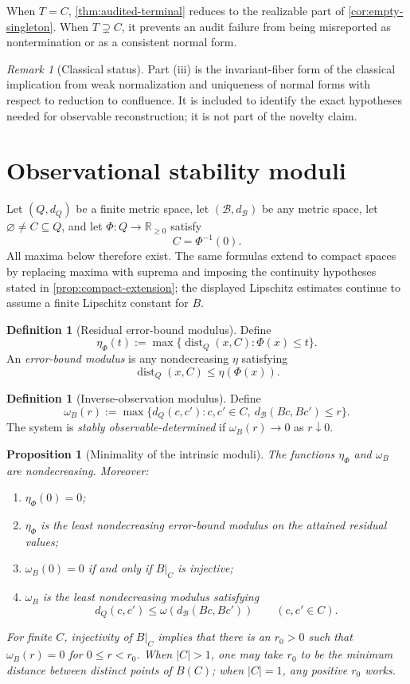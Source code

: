\documentclass[11pt]{article}
\newtheorem{proposition}[theorem]{Proposition}
\theoremstyle{definition}
\newtheorem{definition}[theorem]{Definition}
\theoremstyle{remark}
\newtheorem{remark}[theorem]{Remark}
\numberwithin{equation}{section}
\newcommand{\dist}{\operatorname{dist}}
\newcommand{\cB}{\mathcal B}
\begin{document}
When $T=C$, \cref{thm:audited-terminal} reduces to the realizable part of
\cref{cor:empty-singleton}.  When $T\supsetneq C$, it prevents an audit
failure from being misreported as nontermination or as a consistent normal
form.

\begin{remark}[Classical status]
Part (iii) is the invariant-fiber form of the classical implication from weak normalization and uniqueness of normal forms with respect to reduction to confluence.  It is included to identify the exact hypotheses needed for observable reconstruction; it is not part of the novelty claim.
\end{remark}

\section{Observational stability moduli}\label{sec:stability}

Let $(Q,d_Q)$ be a finite metric space, let $(\cB,d_{\cB})$ be any metric
space, let $\varnothing\ne C\subseteq Q$, and let
$\Phi:Q\to\mathbb R_{\ge0}$ satisfy
\[
 C=\Phi^{-1}(0).
\]
All maxima below therefore exist.  The same formulas extend to compact spaces
by replacing maxima with suprema and imposing the continuity hypotheses stated
in \cref{prop:compact-extension}; the displayed Lipschitz estimates continue
to assume a finite Lipschitz constant for $B$.

\begin{definition}[Residual error-bound modulus]
Define
\[
 \eta_\Phi(t):=
 \max\{\dist_Q(x,C):\Phi(x)\le t\}.
\]
An \emph{error-bound modulus} is any nondecreasing $\eta$ satisfying
\[
 \dist_Q(x,C)\le\eta(\Phi(x)).
\]
\end{definition}

\begin{definition}[Inverse-observation modulus]
Define
\[
 \omega_B(r):=
 \max\{d_Q(c,c'):c,c'\in C,\ d_{\cB}(Bc,Bc')\le r\}.
\]
The system is \emph{stably observable-determined} if $\omega_B(r)\to0$ as $r\downarrow0$.
\end{definition}

\begin{proposition}[Minimality of the intrinsic moduli]\label{prop:minimal-moduli}
The functions $\eta_\Phi$ and $\omega_B$ are nondecreasing.  Moreover:
\begin{enumerate}[label=(\roman*)]
\item $\eta_\Phi(0)=0$;
\item $\eta_\Phi$ is the least nondecreasing error-bound modulus on the attained residual values;
\item $\omega_B(0)=0$ if and only if $B|_C$ is injective;
\item $\omega_B$ is the least nondecreasing modulus satisfying
\[
 d_Q(c,c')\le\omega(d_{\cB}(Bc,Bc'))\qquad(c,c'\in C).
\]
\end{enumerate}
For finite $C$, injectivity of $B|_C$ implies that there is an $r_0>0$ such that
$\omega_B(r)=0$ for $0\le r<r_0$.  When $|C|>1$, one may take $r_0$ to be
the minimum distance between distinct points of $B(C)$; when $|C|=1$, any
positive $r_0$ works.
\end{proposition}
\end{document}
